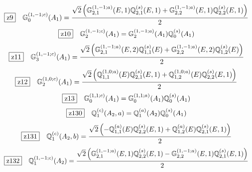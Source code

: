 \documentclass[fleqn,10pt,landscape]{jsarticle}
\begin{document}
\begin{dmath*}
\hspace*{3mm}\fbox{z9}\quad \mathbb{G}_{0}^{(1,-1;c)}(A_{1})=\frac{\sqrt{2} \left(\mathbb{G}_{2,1}^{(1,-1;a)}(E,1) \mathbb{Q}_{2,1}^{(s)}(E,1) + \mathbb{G}_{2,2}^{(1,-1;a)}(E,1) \mathbb{Q}_{2,2}^{(s)}(E,1)\right)}{2}
\end{dmath*}
\begin{dmath*}
\hspace*{3mm}\fbox{z10}\quad \mathbb{G}_{2}^{(1,-1;c)}(A_{1})=\mathbb{G}_{2}^{(1,-1;a)}(A_{1}) \mathbb{Q}_{0}^{(s)}(A_{1})
\end{dmath*}
\begin{dmath*}
\hspace*{3mm}\fbox{z11}\quad \mathbb{G}_{3}^{(1,-1;c)}(A_{1})=\frac{\sqrt{2} \left(\mathbb{G}_{2,1}^{(1,-1;a)}(E,2) \mathbb{Q}_{1,1}^{(s)}(E) + \mathbb{G}_{2,2}^{(1,-1;a)}(E,2) \mathbb{Q}_{1,2}^{(s)}(E)\right)}{2}
\end{dmath*}
\begin{dmath*}
\hspace*{3mm}\fbox{z12}\quad \mathbb{G}_{2}^{(1,0;c)}(A_{1})=\frac{\sqrt{2} \left(\mathbb{Q}_{1,1}^{(1,0;a)}(E) \mathbb{Q}_{2,1}^{(s)}(E,1) + \mathbb{Q}_{1,2}^{(1,0;a)}(E) \mathbb{Q}_{2,2}^{(s)}(E,1)\right)}{2}
\end{dmath*}
\begin{dmath*}
\hspace*{3mm}\fbox{z13}\quad \mathbb{G}_{0}^{(1,1;c)}(A_{1})=\mathbb{G}_{0}^{(1,1;a)}(A_{1}) \mathbb{Q}_{0}^{(s)}(A_{1})
\end{dmath*}
\begin{dmath*}
\hspace*{3mm}\fbox{z130}\quad \mathbb{Q}_{1}^{(c)}(A_{2},a)=\mathbb{Q}_{1}^{(a)}(A_{2}) \mathbb{Q}_{0}^{(s)}(A_{1})
\end{dmath*}
\begin{dmath*}
\hspace*{3mm}\fbox{z131}\quad \mathbb{Q}_{1}^{(c)}(A_{2},b)=\frac{\sqrt{2} \left(- \mathbb{Q}_{1,1}^{(a)}(E) \mathbb{Q}_{2,2}^{(s)}(E,1) + \mathbb{Q}_{1,2}^{(a)}(E) \mathbb{Q}_{2,1}^{(s)}(E,1)\right)}{2}
\end{dmath*}
\begin{dmath*}
\hspace*{3mm}\fbox{z132}\quad \mathbb{Q}_{1}^{(1,-1;c)}(A_{2})=\frac{\sqrt{2} \left(\mathbb{G}_{2,1}^{(1,-1;a)}(E,1) \mathbb{Q}_{2,2}^{(s)}(E,1) - \mathbb{G}_{2,2}^{(1,-1;a)}(E,1) \mathbb{Q}_{2,1}^{(s)}(E,1)\right)}{2}
\end{dmath*}
\end{document}
